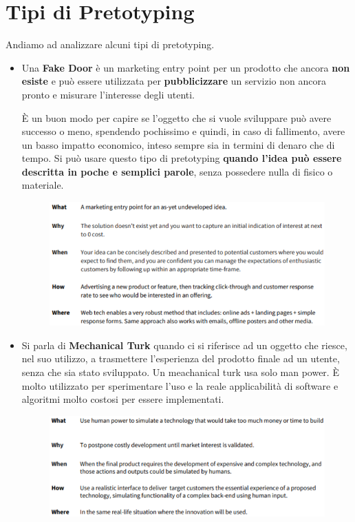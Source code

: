 \documentclass[a4paper,11pt,oneside]{book}
\begin{document}
\section{Tipi di Pretotyping}
Andiamo ad analizzare alcuni tipi di pretotyping.
\begin{itemize}
	\item Una \textbf{Fake Door} è un marketing entry point per un prodotto che ancora \textbf{non esiste} e può essere utilizzata per \textbf{pubblicizzare} un servizio non ancora pronto e misurare l'interesse degli utenti.

	      È un buon modo per capire se l'oggetto che si vuole sviluppare può avere successo o meno, spendendo pochissimo e quindi, in caso di fallimento, avere un basso impatto economico, inteso sempre sia in termini di denaro che di tempo. Si può usare
	      questo tipo di pretotyping \textbf{quando l'idea può essere descritta in poche e semplici parole}, senza possedere nulla di fisico o materiale.

	      \begin{figure}[!h]
		      \centering
		      \includegraphics[scale=0.42]{immagini/Fake_door.png}
	      \end{figure}

	\item Si parla di \textbf{Mechanical Turk} quando ci si riferisce ad un oggetto che riesce, nel suo utilizzo, a trasmettere l'esperienza del prodotto finale ad un utente, senza che sia stato sviluppato. Un meachanical turk usa solo man power. È molto utilizzato per sperimentare l'uso e la reale applicabilità di software e algoritmi molto costosi per essere implementati.

	      \begin{figure}[!h]
		      \centering
		      \includegraphics[scale=0.42]{immagini/Mechanical_turk.png}
	      \end{figure}


\end{itemize}
\end{document}
